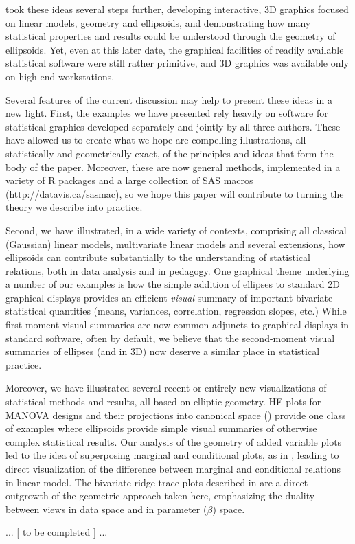 \citet{Monette:90}
took these ideas several steps further, developing interactive, 3D graphics focused on linear
models, geometry and ellipsoids, and demonstrating how many statistical properties
and results could be understood through the geometry of ellipsoids.  Yet, even at this
later date, the graphical facilities of readily available statistical software were still
rather primitive, and 3D graphics was available only on high-end workstations.
 

Several features of the current discussion may help to present these ideas in a
new light.  First, the examples we have presented rely heavily on software for 
statistical graphics developed separately and jointly by all three authors.
These have allowed us to create what we hope are compelling illustrations,
all statistically and geometrically exact, of the principles and ideas that
form the body of the paper.  Moreover, these are now general methods, implemented
in a variety of R packages
\citep{car,heplots1}
and a large collection of SAS macros (\url{http://datavis.ca/sasmac}),
so we hope this paper will contribute to turning the theory we describe
into practice.

Second, we have illustrated, in a wide variety of contexts,
comprising all classical (Gaussian) linear models, multivariate linear models
and several extensions,
how ellipsoids can contribute substantially to the understanding of statistical
relations, both in data analysis and in pedagogy.  One graphical theme underlying
a number of our examples is how the simple addition of ellipses to standard 2D graphical
displays provides an efficient \emph{visual} summary of important bivariate
statistical quantities (means, variances, correlation, regression slopes, etc.)
While first-moment visual summaries are now common adjuncts to graphical displays
in standard software, often by default, we believe that the second-moment visual summaries
of ellipses (and in 3D)
now deserve a similar place in statistical practice. 

Moreover, we have illustrated several recent or entirely new visualizations of 
statistical methods and results, all based on elliptic geometry.
HE plots for MANOVA designs \citep{Friendly:07:manova}
and their projections into canonical space ()
provide one class of examples where ellipsoids provide simple visual summaries of
otherwise complex statistical results.
Our analysis of the geometry of added variable plots led to the idea of superposing
marginal and conditional plots, as in , leading to
direct visualization of the difference between marginal and conditional relations
in linear model.
The bivariate ridge trace plots described in  are a direct outgrowth
of the geometric approach taken here, emphasizing the duality between views in data
space and in parameter ($\beta$) space.




... [ to be completed ] ...




